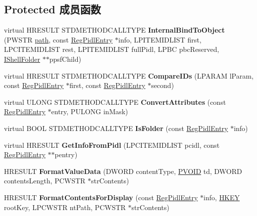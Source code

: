 \subsection*{Protected 成员函数}
\begin{DoxyCompactItemize}
\item 
\mbox{\label{class_c_registry_folder_abf11d252b775d85f04edb5ae7b3c60b7}} 
virtual H\+R\+E\+S\+U\+LT S\+T\+D\+M\+E\+T\+H\+O\+D\+C\+A\+L\+L\+T\+Y\+PE {\bfseries Internal\+Bind\+To\+Object} (P\+W\+S\+TR \hyperlink{structpath}{path}, const \hyperlink{struct_reg_pidl_entry}{Reg\+Pidl\+Entry} $\ast$info, L\+P\+I\+T\+E\+M\+I\+D\+L\+I\+ST first, L\+P\+C\+I\+T\+E\+M\+I\+D\+L\+I\+ST rest, L\+P\+I\+T\+E\+M\+I\+D\+L\+I\+ST full\+Pidl, L\+P\+BC pbc\+Reserved, \hyperlink{interface_i_shell_folder}{I\+Shell\+Folder} $\ast$$\ast$ppsf\+Child)
\item 
\mbox{\label{class_c_registry_folder_a13c3015bf0e9bf963e112e984d69ad39}} 
virtual H\+R\+E\+S\+U\+LT S\+T\+D\+M\+E\+T\+H\+O\+D\+C\+A\+L\+L\+T\+Y\+PE {\bfseries Compare\+I\+Ds} (L\+P\+A\+R\+AM l\+Param, const \hyperlink{struct_reg_pidl_entry}{Reg\+Pidl\+Entry} $\ast$first, const \hyperlink{struct_reg_pidl_entry}{Reg\+Pidl\+Entry} $\ast$second)
\item 
\mbox{\label{class_c_registry_folder_ad0f2b7efb1b3d58dd4adfb2851b4d816}} 
virtual U\+L\+O\+NG S\+T\+D\+M\+E\+T\+H\+O\+D\+C\+A\+L\+L\+T\+Y\+PE {\bfseries Convert\+Attributes} (const \hyperlink{struct_reg_pidl_entry}{Reg\+Pidl\+Entry} $\ast$entry, P\+U\+L\+O\+NG in\+Mask)
\item 
\mbox{\label{class_c_registry_folder_a9e764ccc1d81702429ca7ecb25080945}} 
virtual B\+O\+OL S\+T\+D\+M\+E\+T\+H\+O\+D\+C\+A\+L\+L\+T\+Y\+PE {\bfseries Is\+Folder} (const \hyperlink{struct_reg_pidl_entry}{Reg\+Pidl\+Entry} $\ast$info)
\item 
\mbox{\label{class_c_registry_folder_a020dbb8cb1324f0fe5f35baf150a4bb0}} 
virtual H\+R\+E\+S\+U\+LT {\bfseries Get\+Info\+From\+Pidl} (L\+P\+C\+I\+T\+E\+M\+I\+D\+L\+I\+ST pcidl, const \hyperlink{struct_reg_pidl_entry}{Reg\+Pidl\+Entry} $\ast$$\ast$pentry)
\item 
\mbox{\label{class_c_registry_folder_a0e5bb40db2714c04e9af3c76d85bcbdf}} 
H\+R\+E\+S\+U\+LT {\bfseries Format\+Value\+Data} (D\+W\+O\+RD content\+Type, \hyperlink{interfacevoid}{P\+V\+O\+ID} td, D\+W\+O\+RD contents\+Length, P\+C\+W\+S\+TR $\ast$str\+Contents)
\item 
\mbox{\label{class_c_registry_folder_a3c3bbbdafe6c945146c002dd16b50852}} 
H\+R\+E\+S\+U\+LT {\bfseries Format\+Contents\+For\+Display} (const \hyperlink{struct_reg_pidl_entry}{Reg\+Pidl\+Entry} $\ast$info, \hyperlink{interfacevoid}{H\+K\+EY} root\+Key, L\+P\+C\+W\+S\+TR nt\+Path, P\+C\+W\+S\+TR $\ast$str\+Contents)
\end{DoxyCompactItemize}
